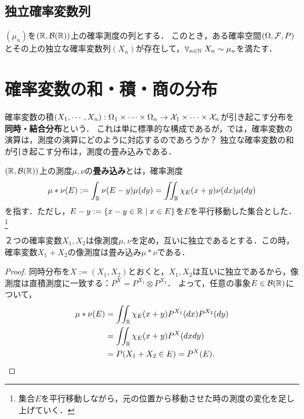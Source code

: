 \documentclass[uplatex,dvipdfmx]{jsreport}
\begin{document}
\subsection{独立確率変数列}

\begin{theorem}
    $(\mu_n)$を$(\mathbb{R},\mathcal{B}(\mathbb{R}))$上の確率測度の列とする．
    このとき，ある確率空間$(\Omega,\mathcal{F},P)$とその上の独立な確率変数列$(X_n)$が存在して，$\forall_{n\in\mathbb{N}}\;X_n\sim\mu_n$を満たす．
\end{theorem}

\section{確率変数の和・積・商の分布}

\begin{tcolorbox}[colframe=ForestGreen, colback=ForestGreen!10!white,breakable,colbacktitle=ForestGreen!40!white,coltitle=black,fonttitle=\bfseries\sffamily,
title=]
    確率変数の積$(X_1,\cdots,X_n):\Omega_1\times\cdots\times\Omega_n\to\mathcal{X}_1\times\cdots\times\mathcal{X}_n$が引き起こす分布を\textbf{同時・結合分布}という．
    これは単に標準的な構成であるが，では，確率変数の演算は，測度の演算にどのように対応するのであろうか？
    独立な確率変数の和が引き起こす分布は，測度の畳み込みである．
\end{tcolorbox}

\begin{definition}
    $(\mathbb{R},\mathcal{B}(\mathbb{R}))$上の測度$\mu,\nu$の\textbf{畳み込み}とは，確率測度
    \[\mu*\nu(E):=\int_{\mathbb{R}}\nu(E-y)\mu(dy)=\iint_{\mathbb{R}}\chi_E(x+y)\nu(dx)\mu(dy)\]
    を指す．ただし，$E-y:=\left\{x-y\in\mathbb{R}\mid x\in E\right\}$を$E$を平行移動した集合とした．
    \footnote{集合$E$を平行移動しながら，元の位置から移動させた時の測度の変化を足し上げていく．}
\end{definition}

\begin{proposition}
    ２つの確率変数$X_1,X_2$は像測度$\mu,\nu$を定め，互いに独立であるとする．この時，確率変数$X_1+X_2$の像測度は畳み込み$\mu*\nu$である．
\end{proposition}
\begin{proof}
    同時分布を$X:=(X_1,X_2)$とおくと，$X_1,X_2$は互いに独立であるから，像測度は直積測度に一致する：$P^X=P^{X_1}\otimes P^{X_2}$．
    よって，任意の事象$E\in\mathcal{B}(\mathbb{R})$について，
    \begin{align*}
        \mu*\nu(E)&=\iint_{\mathbb{R}}\chi_E(x+y)P^{X_1}(dx)P^{X_2}(dy)\\
        &=\iint_{\mathbb{R}}\chi_E(x+y)P^X(dxdy)\\
        &=P(X_1+X_2\in E)=P^X(E).
    \end{align*}
\end{proof}
\end{document}
